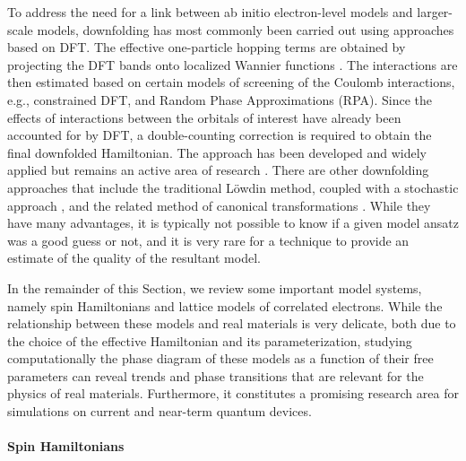 To address the need for a link between ab initio electron-level models and larger-scale models, downfolding has most commonly been carried out using approaches based on DFT. The effective one-particle hopping terms are obtained by projecting the DFT bands onto localized Wannier functions \cite{pavarini2001band}. The interactions are then estimated based on certain models of screening of the Coulomb interactions, e.g., constrained DFT, and Random Phase Approximations (RPA). Since the effects of interactions between the orbitals of interest have already been accounted for by DFT, a double-counting correction is required to obtain the final downfolded Hamiltonian. The approach has been developed and widely applied \cite{aryasetiawan2004frequency,jeschke2013first,haule2015exact} but remains an active area of research \cite{haule2015exact}. 
There are other downfolding approaches that include the traditional L\"{o}wdin method, coupled with a stochastic approach  \cite{ten2013stochastic,zhou2010construction}, and the related method of canonical transformations  \cite{white2002numerical,yanai2006canonical}. While they have many advantages, it is typically not possible to know if a given model ansatz was a good guess or not, and it is very rare for a technique to provide an estimate of the quality of the resultant model.

In the remainder of this Section, we review some important model systems, namely spin Hamiltonians and lattice models of correlated electrons. While the relationship between these models and real materials is very delicate, both due to the choice of the effective Hamiltonian and its parameterization, studying computationally the phase diagram of these models as a function of their free parameters can reveal trends and phase transitions that are relevant for the physics of real materials. Furthermore, it constitutes a promising research area for simulations on current and near-term quantum devices.

\paragraph{Spin Hamiltonians}

